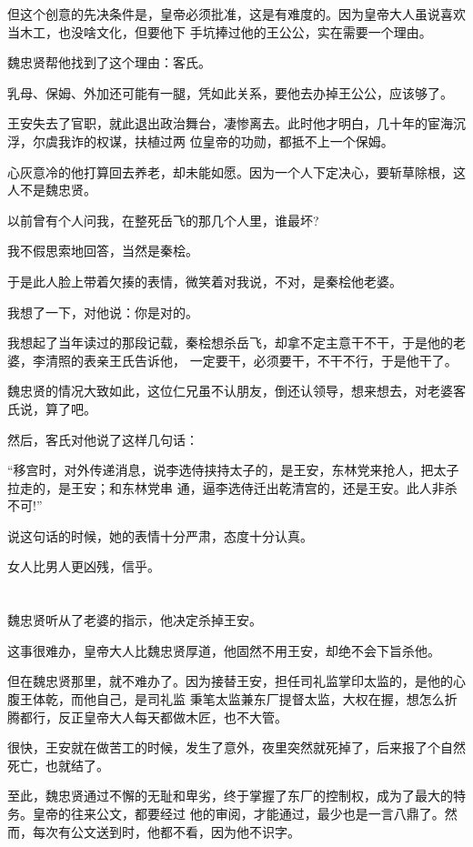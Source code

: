 \documentclass[11pt,a4paper,onecolumn]{article}
\begin{document}
但这个创意的先决条件是，皇帝必须批准，这是有难度的。因为皇帝大人虽说喜欢当木工，也没啥文化，但要他下
手坑捧过他的王公公，实在需要一个理由。

魏忠贤帮他找到了这个理由：客氏。

乳母、保姆、外加还可能有一腿，凭如此关系，要他去办掉王公公，应该够了。

王安失去了官职，就此退出政治舞台，凄惨离去。此时他才明白，几十年的宦海沉浮，尔虞我诈的权谋，扶植过两
位皇帝的功勋，都抵不上一个保姆。

心灰意冷的他打算回去养老，却未能如愿。因为一个人下定决心，要斩草除根，这人不是魏忠贤。

以前曾有个人问我，在整死岳飞的那几个人里，谁最坏?

我不假思索地回答，当然是秦桧。

于是此人脸上带着欠揍的表情，微笑着对我说，不对，是秦桧他老婆。

我想了一下，对他说：你是对的。

我想起了当年读过的那段记载，秦桧想杀岳飞，却拿不定主意干不干，于是他的老婆，李清照的表亲王氏告诉他，
一定要干，必须要干，不干不行，于是他干了。

魏忠贤的情况大致如此，这位仁兄虽不认朋友，倒还认领导，想来想去，对老婆客氏说，算了吧。

然后，客氏对他说了这样几句话：

``移宫时，对外传递消息，说李选侍挟持太子的，是王安，东林党来抢人，把太子拉走的，是王安；和东林党串
通，逼李选侍迁出乾清宫的，还是王安。此人非杀不可!''

说这句话的时候，她的表情十分严肃，态度十分认真。

女人比男人更凶残，信乎。

\section[\thesection]{}

魏忠贤听从了老婆的指示，他决定杀掉王安。

这事很难办，皇帝大人比魏忠贤厚道，他固然不用王安，却绝不会下旨杀他。

但在魏忠贤那里，就不难办了。因为接替王安，担任司礼监掌印太监的，是他的心腹王体乾，而他自己，是司礼监
秉笔太监兼东厂提督太监，大权在握，想怎么折腾都行，反正皇帝大人每天都做木匠，也不大管。

很快，王安就在做苦工的时候，发生了意外，夜里突然就死掉了，后来报了个自然死亡，也就结了。

至此，魏忠贤通过不懈的无耻和卑劣，终于掌握了东厂的控制权，成为了最大的特务。皇帝的往来公文，都要经过
他的审阅，才能通过，最少也是一言八鼎了。然而，每次有公文送到时，他都不看，因为他不识字。
\end{document}
